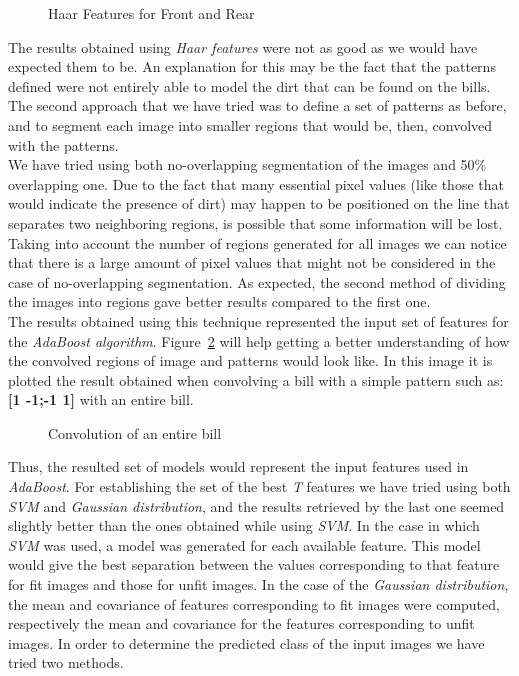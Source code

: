 \documentclass[11pt,twocolumn]{article}
\begin{document}
\begin{figure}[!hbtp]
\centering
{}
\caption{Haar Features for Front and Rear}
\label{Haar_features}
\end{figure}
	\hspace*{10px}The results obtained using \emph{Haar features} were not as good as we would have expected them to be. An explanation for this may be the fact that the patterns defined were not entirely able to model the dirt that can be found on the bills.\\
	\hspace*{10px}The second approach that we have tried was to define a set of patterns as before, and to segment each image into smaller regions that would be, then, convolved with the patterns.\\
	\hspace*{10px}We have tried using both no-overlapping segmentation of the images and 50\% overlapping one. Due to the fact that many essential pixel values (like those that would indicate the presence of dirt) may happen to be positioned on the line that separates two neighboring regions, is possible that some information will be lost. Taking into account the number of regions generated for all images we can notice that there is a large amount of pixel values that might not be considered in the case of no-overlapping segmentation. As expected, the second method of dividing the images into regions gave better results compared to the first one.\\ 
	\hspace*{10px}The results obtained using this technique represented the input set of features for the \emph{AdaBoost algorithm}. Figure~\ref{convolved} will help getting a better understanding of how the convolved regions of image and patterns would look like. In this image it is plotted the result obtained when convolving a bill with a simple pattern such as: \textbf{[1 -1;-1 1]} with an entire bill.\\
\begin{figure}[!hbtp]
\centering
{}
\caption{Convolution of an entire bill}
\label{convolved}
\end{figure} 
Thus, the resulted set of models would represent the input features used in \emph{AdaBoost}. For establishing the set of the best \emph{T} features we have tried using both \emph{SVM} and \emph{Gaussian distribution}, and the results retrieved by the last one seemed slightly better than the ones obtained while using \emph{SVM}. In the case in which \emph{SVM} was used, a model was generated for each available feature. This model would give the best separation between the values corresponding to that feature for fit images and those for unfit images. In the case of the \emph{Gaussian distribution}, the mean and covariance of features corresponding to fit images were computed, respectively the mean and covariance for the features corresponding to unfit images. In order to determine the predicted class of the input images we have tried two methods.\\
\end{document}
